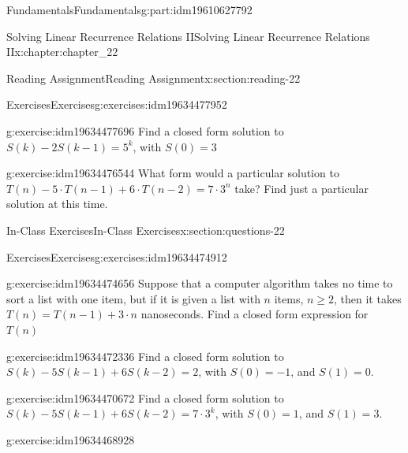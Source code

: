 \documentclass[oneside,10pt,]{book}
\numberwithin{equation}{section}
\begin{document}
\begin{partptx}{Fundamentals}{}{Fundamentals}{}{}{g:part:idm19610627792}
\begin{chapterptx}{Solving Linear Recurrence Relations II}{}{Solving Linear Recurrence Relations II}{}{}{x:chapter:chapter_22}
\begin{sectionptx}{Reading Assignment}{}{Reading Assignment}{}{}{x:section:reading-22}
\begin{exercises-subsection-numberless}{Exercises}{}{Exercises}{}{}{g:exercises:idm19634477952}
\begin{exercisegroup}
\begin{divisionexerciseeg}{1}{}{}{g:exercise:idm19634477696}%
Find a closed form solution to \(S(k) - 2 S (k - 1) = 5^k\), with \(S(0) = 3\)%
\end{divisionexerciseeg}%
\begin{divisionexerciseeg}{2}{}{}{g:exercise:idm19634476544}%
What form would a particular solution to \(T(n)-5\cdot T(n-1)+6\cdot T(n-2)=7 \cdot 3^n\) take?  Find just a particular solution at this time.%
\end{divisionexerciseeg}%
\end{exercisegroup}
\par\medskip\noindent
\end{exercises-subsection-numberless}
\end{sectionptx}
%
%
\typeout{************************************************}
\typeout{************************************************}
%
\begin{sectionptx}{In-Class Exercises}{}{In-Class Exercises}{}{}{x:section:questions-22}
%
%
%
\typeout{************************************************}
\typeout{************************************************}
%
\begin{exercises-subsection-numberless}{Exercises}{}{Exercises}{}{}{g:exercises:idm19634474912}
\par\medskip\noindent%
%
\begin{exercisegroup}
\begin{divisionexerciseeg}{1}{}{}{g:exercise:idm19634474656}%
Suppose that a computer algorithm takes no time to sort a list with one item, but if it is given a list with \(n\) items, \(n \geq 2\), then it takes \(T(n) = T(n-1) + 3\cdot n\) nanoseconds.  Find a closed form expression for \(T(n)\)%
\end{divisionexerciseeg}%
\begin{divisionexerciseeg}{2}{}{}{g:exercise:idm19634472336}%
Find a closed form solution to \(S(k) - 5S(k - 1) + 6S(k - 2) = 2\), with \(S(0) = -1\), and \(S(1) = 0\).%
\end{divisionexerciseeg}%
\begin{divisionexerciseeg}{3}{}{}{g:exercise:idm19634470672}%
Find a closed form solution to \(S(k) - 5S(k - 1) + 6S(k - 2) = 7 \cdot 3^k\), with \(S(0) = 1\), and \(S(1) = 3\).%
\end{divisionexerciseeg}%
\begin{divisionexerciseeg}{4}{}{}{g:exercise:idm19634468928}%

\end{divisionexerciseeg}
\end{exercisegroup}
\end{exercises-subsection-numberless}
\end{sectionptx}
\end{chapterptx}
\end{partptx}
\end{document}
